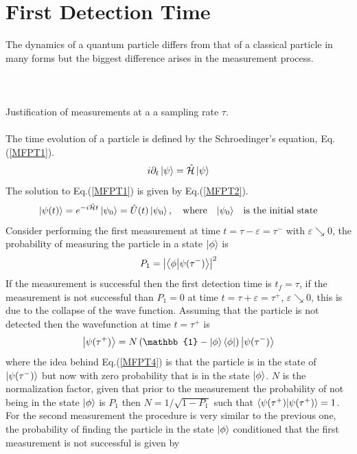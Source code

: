 \documentclass{article}
\numberwithin{equation}{section}
\renewcommand{\H}{\mathcal{\hat{H}}}
\newcommand{\1}{\mathbb{1}}
\newcommand{\state}{\ket{\phi}}
\newcommand{\projection}{\bra{\phi}}
\begin{document}
\section{First Detection Time}
The dynamics of a quantum particle differs from that of a classical particle in many forms but the biggest difference arises in the measurement process. 
\\
\\
\\
\\
Justification of measurements at a a sampling rate $\tau$. 
\\\\
The time evolution of a particle is defined by the Schroedinger's equation, Eq.(\ref{MFPT1}).
\begin{equation}\label{MFPT1}
    i\partial_t\ket{\psi}=\H\ket{\psi}
\end{equation}
The solution to Eq.(\ref{MFPT1}) is given by Eq.(\ref{MFPT2}).
\begin{equation}\label{MFPT2}
\ket{\psi(t)}=e^{-i\H t}\ket{\psi_0}=\hat{U}(t)\ket{\psi_0}, \quad \text{where} \quad {\ket{\psi_0}}\quad \text{is the initial state}
\end{equation}
Consider performing the first measurement at time $t=\tau-\varepsilon=\tau^-$ with $\varepsilon\searrow0$, the probability of measuring the particle in a state $\state$ is 
\begin{equation}\label{MFPT3}
    P_1=\abs{\projection\ket{\psi(\tau^-)}}^2
\end{equation}
If the measurement is successful then the first detection time is $t_f=\tau$, if the measurement is not successful than $P_1=0$ at time $t=\tau+\varepsilon=\tau^+$, $\varepsilon\searrow0$, this is due to the collapse of the wave function. Assuming that the particle is not detected then the wavefunction at time $t=\tau^+$ is
\begin{equation}\label{MFPT4}
    \ket{\psi(\tau^+)}=N\left(\1-\state\bra{\phi} \right)\ket{\psi(\tau^-)}
\end{equation}
where the idea behind Eq.(\ref{MFPT4}) is that the particle is in the state of $\ket{\psi(\tau^-)}$ but now with zero probability that is in the state $\state$. $N$ is the normalization factor, given that prior to the measurement the probability of not being in the state $\state$ is $P_1$ then $N=1/\sqrt{1-P_1}$ such that $\braket{\psi(\tau^+)}{\psi(\tau^+)}=1$.
\\
For the second measurement the procedure is very similar to the previous one, the probability of finding the particle in the state $\state$ conditioned that the first measurement is not successful is given by
\end{document}
